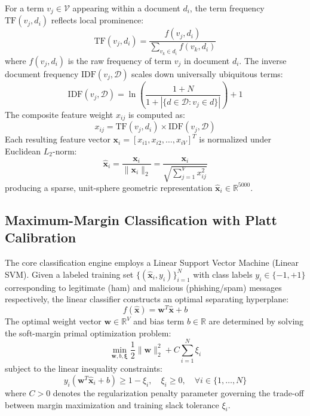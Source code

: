 \documentclass[conference]{IEEEtran}
\begin{document}
For a term $v_j \in \mathcal{V}$ appearing within a document $d_i$, the term frequency $\text{TF}(v_j, d_i)$ reflects local prominence:
\begin{equation}
    \text{TF}(v_j, d_i) = \frac{f(v_j, d_i)}{\sum_{v_k \in d_i} f(v_k, d_i)}
\end{equation}
where $f(v_j, d_i)$ is the raw frequency of term $v_j$ in document $d_i$. The inverse document frequency $\text{IDF}(v_j, \mathcal{D})$ scales down universally ubiquitous terms:
\begin{equation}
    \text{IDF}(v_j, \mathcal{D}) = \ln \left( \frac{1 + N}{1 + |\{d \in \mathcal{D} : v_j \in d\}|} \right) + 1
\end{equation}
The composite feature weight $x_{ij}$ is computed as:
\begin{equation}
    x_{ij} = \text{TF}(v_j, d_i) \times \text{IDF}(v_j, \mathcal{D})
\end{equation}
Each resulting feature vector $\mathbf{x}_i = [x_{i1}, x_{i2}, \dots, x_{iV}]^T$ is normalized under Euclidean $L_2$-norm:
\begin{equation}
    \hat{\mathbf{x}}_i = \frac{\mathbf{x}_i}{\|\mathbf{x}_i\|_2} = \frac{\mathbf{x}_i}{\sqrt{\sum_{j=1}^V x_{ij}^2}}
\end{equation}
producing a sparse, unit-sphere geometric representation $\hat{\mathbf{x}}_i \in \mathbb{R}^{5000}$.

\subsection{Maximum-Margin Classification with Platt Calibration}
The core classification engine employs a Linear Support Vector Machine (Linear SVM). Given a labeled training set $\{(\hat{\mathbf{x}}_i, y_i)\}_{i=1}^N$ with class labels $y_i \in \{-1, +1\}$ corresponding to legitimate (ham) and malicious (phishing/spam) messages respectively, the linear classifier constructs an optimal separating hyperplane:
\begin{equation}
    f(\hat{\mathbf{x}}) = \mathbf{w}^T \hat{\mathbf{x}} + b
\end{equation}
The optimal weight vector $\mathbf{w} \in \mathbb{R}^V$ and bias term $b \in \mathbb{R}$ are determined by solving the soft-margin primal optimization problem:
\begin{equation}
    \min_{\mathbf{w}, b, \boldsymbol{\xi}} \frac{1}{2} \|\mathbf{w}\|_2^2 + C \sum_{i=1}^N \xi_i
\end{equation}
subject to the linear inequality constraints:
\begin{equation}
    y_i (\mathbf{w}^T \hat{\mathbf{x}}_i + b) \ge 1 - \xi_i, \quad \xi_i \ge 0, \quad \forall i \in \{1, \dots, N\}
\end{equation}
where $C > 0$ denotes the regularization penalty parameter governing the trade-off between margin maximization and training slack tolerance $\xi_i$.
\end{document}
